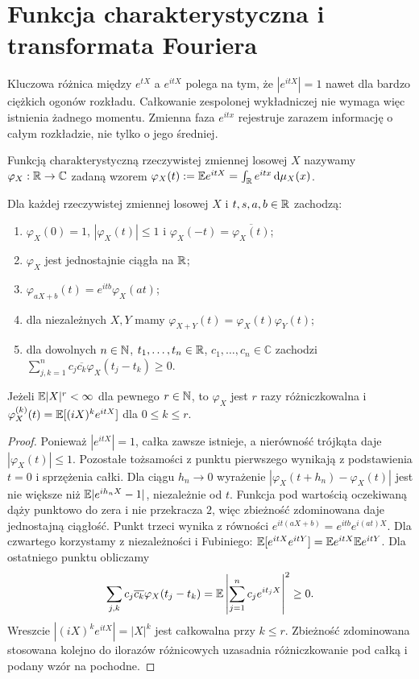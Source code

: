 \section{Funkcja charakterystyczna i transformata Fouriera}

Kluczowa różnica między $e^{tX}$ a $e^{itX}$ polega na tym,
że $|e^{itX}|=1$ nawet dla bardzo ciężkich ogonów rozkładu.
Całkowanie zespolonej wykładniczej nie wymaga więc istnienia
żadnego momentu. Zmienna faza $e^{itx}$ rejestruje zarazem
informację o całym rozkładzie, nie tylko o jego średniej.

\begin{definicja}
Funkcją charakterystyczną rzeczywistej zmiennej losowej $X$
nazywamy $\varphi_X:\mathbb{R}\to\mathbb C$ zadaną wzorem
$\varphi_X(t):=\mathbb{E} e^{itX}=\int_{\mathbb{R}} e^{itx}\,\mathrm{d}\mu_X(x)$.
\end{definicja}

\begin{twierdzenie}
Dla każdej rzeczywistej zmiennej losowej $X$ i
$t,s,a,b\in\mathbb{R}$ zachodzą:
\begin{enumerate}
\item $\varphi_X(0)=1$, $|\varphi_X(t)|\leq1$
 i $\varphi_X(-t)=\overline{\varphi_X(t)}$;
\item $\varphi_X$ jest jednostajnie ciągła na $\mathbb{R}$;
\item $\varphi_{aX+b}(t)=e^{itb}\varphi_X(at)$;
\item dla niezależnych $X,Y$ mamy
 $\varphi_{X+Y}(t)=\varphi_X(t)\varphi_Y(t)$;
\item dla dowolnych $n\in\mathbb{N}$, $t_1,\ldots,t_n\in\mathbb{R}$,
 $c_1,\ldots,c_n\in\mathbb C$ zachodzi
 $\sum_{j,k=1}^n c_j\overline{c_k}\varphi_X(t_j-t_k)\geq0$.
\end{enumerate}
Jeżeli $\mathbb{E}|X|^r<\infty$ dla pewnego $r\in\mathbb{N}$,
to $\varphi_X$ jest $r$ razy różniczkowalna i
$\varphi_X^{(k)}(t)=\mathbb{E}[(iX)^k e^{itX}]$
dla $0\leq k\leq r$.
\end{twierdzenie}
\begin{proof}
Ponieważ $|e^{itX}|=1$, całka zawsze istnieje,
a nierówność trójkąta daje $|\varphi_X(t)|\leq1$.
Pozostałe tożsamości z punktu pierwszego wynikają
z podstawienia $t=0$ i sprzężenia całki.
Dla ciągu $h_n\to0$ wyrażenie
$|\varphi_X(t+h_n)-\varphi_X(t)|$
jest nie większe niż $\mathbb{E}|e^{ih_nX}-1|$, niezależnie od $t$.
Funkcja pod wartością oczekiwaną dąży punktowo do zera
i nie przekracza $2$, więc zbieżność zdominowana daje
jednostajną ciągłość. Punkt trzeci wynika z równości
$e^{it(aX+b)}=e^{itb}e^{i(at)X}$.
Dla czwartego korzystamy z niezależności i Fubiniego:
$\mathbb{E}[e^{itX}e^{itY}]=\mathbb{E} e^{itX}\mathbb{E} e^{itY}$.
Dla ostatniego punktu obliczamy
\[
\sum_{j,k}c_j\overline{c_k}\varphi_X(t_j-t_k)
=\mathbb{E}\left|\sum_{j=1}^n c_je^{it_jX}\right|^2\geq0.
\]
Wreszcie $|(iX)^k e^{itX}|=|X|^k$ jest całkowalna
przy $k\leq r$. Zbieżność zdominowana stosowana
kolejno do ilorazów różnicowych uzasadnia różniczkowanie
pod całką i podany wzór na pochodne.
\end{proof}

